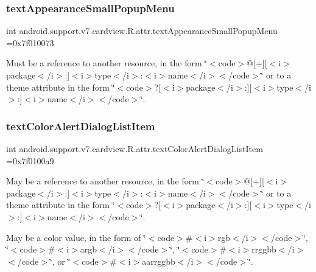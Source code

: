 \subsubsection{\texorpdfstring{text\+Appearance\+Small\+Popup\+Menu}{textAppearanceSmallPopupMenu}}
{\footnotesize\ttfamily int android.\+support.\+v7.\+cardview.\+R.\+attr.\+text\+Appearance\+Small\+Popup\+Menu =0x7f010073\hspace{0.3cm}{\ttfamily [static]}}

Must be a reference to another resource, in the form \char`\"{}$<$code$>$@\mbox{[}+\mbox{]}\mbox{[}$<$i$>$package$<$/i$>$\+:\mbox{]}$<$i$>$type$<$/i$>$\+:$<$i$>$name$<$/i$>$$<$/code$>$\char`\"{} or to a theme attribute in the form \char`\"{}$<$code$>$?\mbox{[}$<$i$>$package$<$/i$>$\+:\mbox{]}\mbox{[}$<$i$>$type$<$/i$>$\+:\mbox{]}$<$i$>$name$<$/i$>$$<$/code$>$\char`\"{}. \mbox{\label{classandroid_1_1support_1_1v7_1_1cardview_1_1R_1_1attr_a173e914627b371b0d2f5da8b4c71b625}} 
\subsubsection{\texorpdfstring{text\+Color\+Alert\+Dialog\+List\+Item}{textColorAlertDialogListItem}}
{\footnotesize\ttfamily int android.\+support.\+v7.\+cardview.\+R.\+attr.\+text\+Color\+Alert\+Dialog\+List\+Item =0x7f0100a9\hspace{0.3cm}{\ttfamily [static]}}

May be a reference to another resource, in the form \char`\"{}$<$code$>$@\mbox{[}+\mbox{]}\mbox{[}$<$i$>$package$<$/i$>$\+:\mbox{]}$<$i$>$type$<$/i$>$\+:$<$i$>$name$<$/i$>$$<$/code$>$\char`\"{} or to a theme attribute in the form \char`\"{}$<$code$>$?\mbox{[}$<$i$>$package$<$/i$>$\+:\mbox{]}\mbox{[}$<$i$>$type$<$/i$>$\+:\mbox{]}$<$i$>$name$<$/i$>$$<$/code$>$\char`\"{}. 

May be a color value, in the form of \char`\"{}$<$code$>$\#$<$i$>$rgb$<$/i$>$$<$/code$>$\char`\"{}, \char`\"{}$<$code$>$\#$<$i$>$argb$<$/i$>$$<$/code$>$\char`\"{}, \char`\"{}$<$code$>$\#$<$i$>$rrggbb$<$/i$>$$<$/code$>$\char`\"{}, or \char`\"{}$<$code$>$\#$<$i$>$aarrggbb$<$/i$>$$<$/code$>$\char`\"{}. \mbox{\label{classandroid_1_1support_1_1v7_1_1cardview_1_1R_1_1attr_a6ebe55f0aafed61cb45ed177453eb969}} 

